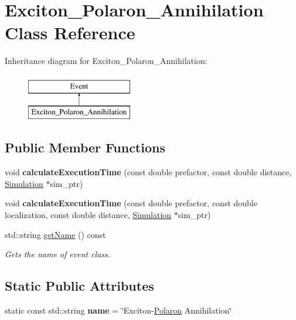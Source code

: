 \hypertarget{class_exciton___polaron___annihilation}{}\section{Exciton\+\_\+\+Polaron\+\_\+\+Annihilation Class Reference}
\label{class_exciton___polaron___annihilation}
Inheritance diagram for Exciton\+\_\+\+Polaron\+\_\+\+Annihilation\+:\begin{figure}[H]
\begin{center}
\leavevmode
\includegraphics[height=2.000000cm]{class_exciton___polaron___annihilation}
\end{center}
\end{figure}
\subsection*{Public Member Functions}
\begin{DoxyCompactItemize}
\item 
\mbox{\label{class_exciton___polaron___annihilation_a7206c9b930c1e1da35dc62e25c127e3c}} 
void {\bfseries calculate\+Execution\+Time} (const double prefactor, const double distance, \hyperlink{class_simulation}{Simulation} $\ast$sim\+\_\+ptr)
\item 
\mbox{\label{class_exciton___polaron___annihilation_a5818e1cdc2e6fd3ba744826efd2c40bf}} 
void {\bfseries calculate\+Execution\+Time} (const double prefactor, const double localization, const double distance, \hyperlink{class_simulation}{Simulation} $\ast$sim\+\_\+ptr)
\item 
std\+::string \hyperlink{class_exciton___polaron___annihilation_aea3ae0f18ba7743d2183c2c5fbf4d4c4}{get\+Name} () const
\begin{DoxyCompactList}\small\item\em Gets the name of event class. \end{DoxyCompactList}\end{DoxyCompactItemize}
\subsection*{Static Public Attributes}
\begin{DoxyCompactItemize}
\item 
\mbox{\label{class_exciton___polaron___annihilation_a49bc9251aed38c5a7249385d9bf93dc9}} 
static const std\+::string {\bfseries name} = \char`\"{}Exciton-\/\hyperlink{class_polaron}{Polaron} Annihilation\char`\"{}
\end{DoxyCompactItemize}


